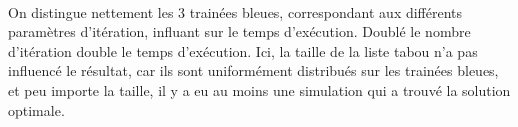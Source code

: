 \documentclass[12pt]{article}
\begin{document}
\begin{figure}[!h]
\begin{floatrow}
\end{floatrow}
\end{figure}

\paragraph{}On distingue nettement les 3 trainées bleues, correspondant aux différents paramètres d'itération, influant sur le temps d'exécution. Doublé le nombre d'itération double le temps d'exécution. Ici, la taille de la liste tabou n'a pas influencé le résultat, car ils sont uniformément distribués sur les trainées bleues, et peu importe la taille, il y a eu au moins une simulation qui a trouvé la solution optimale.
\end{document}
